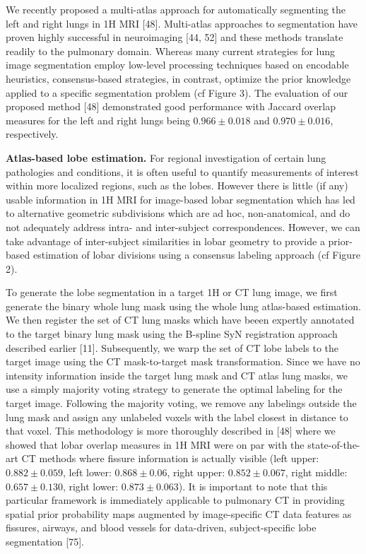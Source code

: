 \documentclass[11pt,]{article}
\begin{document}
We recently proposed a multi-atlas approach for automatically segmenting
the left and right lungs in 1H MRI {[}48{]}. Multi-atlas approaches to
segmentation have proven highly successful in neuroimaging {[}44, 52{]}
and these methods translate readily to the pulmonary domain. Whereas
many current strategies for lung image segmentation employ low-level
processing techniques based on encodable heuristics, consensus-based
strategies, in contrast, optimize the prior knowledge applied to a
specific segmentation problem (cf Figure 3). The evaluation of our
proposed method {[}48{]} demonstrated good performance with Jaccard
overlap measures for the left and right lungs being $0.966 \pm 0.018$
and $0.970 \pm 0.016$, respectively.

\textbf{Atlas-based lobe estimation.} For regional investigation of
certain lung pathologies and conditions, it is often useful to quantify
measurements of interest within more localized regions, such as the
lobes. However there is little (if any) usable information in 1H MRI for
image-based lobar segmentation which has led to alternative geometric
subdivisions which are ad hoc, non-anatomical, and do not adequately
address intra- and inter-subject correspondences. However, we can take
advantage of inter-subject similarities in lobar geometry to provide a
prior-based estimation of lobar divisions using a consensus labeling
approach (cf Figure 2).

To generate the lobe segmentation in a target 1H or CT lung image, we
first generate the binary whole lung mask using the whole lung
atlas-based estimation. We then register the set of CT lung masks which
have beeen expertly annotated to the target binary lung mask using the
B-spline SyN registration approach described earlier {[}11{]}.
Subsequently, we warp the set of CT lobe labels to the target image
using the CT mask-to-target mask transformation. Since we have no
intensity information inside the target lung mask and CT atlas lung
masks, we use a simply majority voting strategy to generate the optimal
labeling for the target image. Following the majority voting, we remove
any labelings outside the lung mask and assign any unlabeled voxels with
the label closest in distance to that voxel. This methodology is more
thoroughly described in {[}48{]} where we showed that lobar overlap
measures in 1H MRI were on par with the state-of-the-art CT methods
where fissure information is actually visible (left upper:
$0.882 \pm 0.059$, left lower: $0.868 \pm 0.06$, right upper:
$0.852 \pm 0.067$, right middle: $0.657 \pm 0.130$, right lower:
$0.873 \pm 0.063$). It is important to note that this particular
framework is immediately applicable to pulmonary CT in providing spatial
prior probability maps augmented by image-specific CT data features as
fissures, airways, and blood vessels for data-driven, subject-specific
lobe segmentation {[}75{]}.
\end{document}
